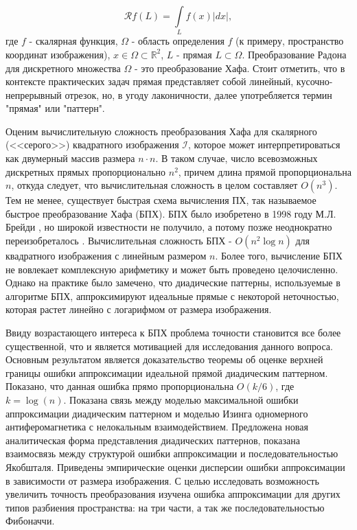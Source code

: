 \begin{equation}\label{eq:radon}
	\mathcal{R}f(L) = \int\limits_{L} f(x) |dx|,
\end{equation}
где $f$ - скалярная функция, $\Omega$ - область определения $f$ (к примеру, пространство координат изображения), $x \in \Omega \subset \mathbb{R}^2$, $L$ - прямая $L \subset \Omega$. 
Преобразование Радона для дискретного множества $\Omega$ - это преобразование Хафа. 
Стоит отметить, что в контексте практических задач прямая представляет собой линейный, кусочно-непрерывный отрезок, но, в угоду лаконичности, далее употребляется термин "прямая" или "паттерн".

Оценим вычислительную сложность преобразования Хафа для скалярного (<<серого>>) квадратного изображения $\mathcal{I}$, которое может интерпретироваться как двумерный массив размера $n \cdot n$. 
В таком случае, число всевозможных дискретных прямых пропорционально $n^2$, причем длина прямой пропорциональна $n$, откуда следует, что вычислительная сложность в целом составляет $O(n^3)$. 
Тем не менее, существует быстрая схема вычисления ПХ, так называемое быстрое преобразование Хафа (БПХ). 
БПХ было изобретено в 1998 году М.Л. Брейди \cite{Brady1998}, но широкой известности не получило, а потому позже неоднократно переизобреталось \cite{NiksKarp2004rus, Fred2005}. 
Вычислительная сложность БПХ -  $O(n^2 \log{n})$ для квадратного изображения с линейным размером $n$. 
Более того, вычисление БПХ не вовлекает комплексную арифметику и может быть проведено целочисленно. 
Однако на практике было замечено, что диадические паттерны, используемые в алгоритме БПХ, аппроксимируют идеальные прямые с некоторой неточностью, которая растет линейно с логарифмом от размера изображения.

Ввиду возрастающего интереса к БПХ проблема точности становится все более существенной, что и является мотивацией для исследования данного вопроса.
Основным результатом является доказательство теоремы об оценке верхней границы ошибки аппроксимации идеальной прямой диадическим паттерном.
Показано, что данная ошибка прямо пропорциональна $O(k/6)$, где $k = \log(n)$. 
Показана связь между моделью максимальной ошибки аппроксимации диадическим паттерном и моделью Изинга одномерного антиферомагнетика с нелокальным взаимодействием.
Предложена новая аналитическая форма представления диадических паттернов, показана взаимосвязь между структурой ошибки аппроксимации и последовательностью Якобшталя.
Приведены эмпирические оценки дисперсии ошибки аппроксимации в зависимости от размера изображения.
С целью исследовать возможность увеличить точность преобразования изучена ошибка аппроксимации для других типов разбиения пространства: на три части, а так же последовательностью Фибоначчи.

